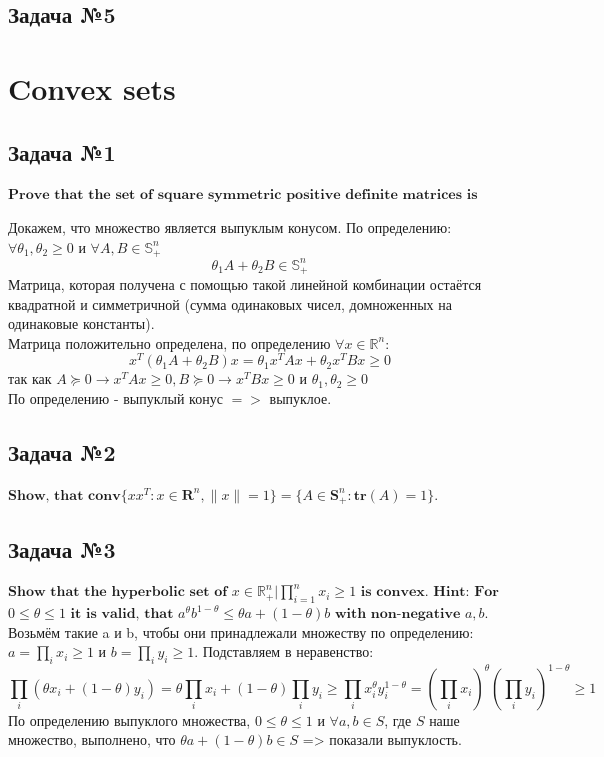 \documentclass[12pt,letterpaper]{article}
\begin{document}
\subsection*{Задача №5}

\newpage
\section{Convex sets}
\subsection*{Задача №1}
${\textbf{Prove that the set of square symmetric positive definite matrices is convex.}}$

Докажем, что множество является выпуклым конусом. По определению: $ \forall \theta_1, \theta_2 \geqslant 0$ и $ \forall A, B \in \mathbb{S}_{+}^{n} $ 
$$
\theta_{1} A+\theta_{2} B \in \mathbb{S}_{+}^{n}
$$
Матрица, которая получена с помощью такой линейной комбинации остаётся квадратной и симметричной (сумма одинаковых чисел, домноженных на одинаковые константы).\\ 
Матрица положительно определена, по определению $ \forall x \in \mathbb{R}^n $:
$$x^{T}\left(\theta_{1} A+\theta_{2} B\right) x=\theta_{1} x^{T} A x+\theta_{2} x^{T} B x \geq 0$$
так как $A \succeq 0 \rightarrow x^{T} A x \geqslant 0, B \succeq 0 \rightarrow x^{T} B x \geqslant 0  \text { и } \theta_{1}, \theta_{2} \geq 0$\\
По определению - выпуклый конус $=>$ выпуклое.

\subsection*{Задача №2}
$\textbf{Show, that}$ $\textbf{conv}\{xx^T:x\in \textbf{R}^n, \parallel x\parallel =1\}=\{A\in \textbf{S}^n_+: \textbf{tr}(A)=1\}.$


\subsection*{Задача №3}
$\textbf{Show that the hyperbolic set of}$ $ {x \in \mathbb{R}^n_+ | \prod\limits_{i=1}^n x_i \geq 1 } $ $\textbf{is convex. Hint: For}$ $0 \leq \theta \leq 1$ $\textbf{it is valid, that}$ $a^\theta b^{1 - \theta} \leq \theta a + (1-\theta)b$ $\textbf{with non-negative}$ $a,b$.\\

Возьмём такие a и b, чтобы они принадлежали множеству по определению: $ a = \prod\limits_{i} x_{i} \geq 1 \text { и } b = \prod\limits_{i} y_{i} \geq 1 $.
Подставляем в неравенство: 
$$\prod\limits_{i}\left(\theta x_{i}+(1-\theta) y_{i}\right) = \theta \prod\limits_i x_i + \left( 1 - \theta \right) \prod\limits_i y_i  \geq \prod\limits_i x_{i}^{\theta} y_{i}^{1-\theta}=\left(\prod\limits_{i} x_{i}\right)^{\theta}\left(\prod\limits_{i} y_{i}\right)^{1-\theta} \geq 1$$
По определению выпуклого множества, $0 \leq \theta \leq 1$ и $ \forall a, b \in S $, где $ S $ наше множество, выполнено, что $ \theta a + (1 - \theta) b \in S $ => показали выпуклость.
\end{document}
